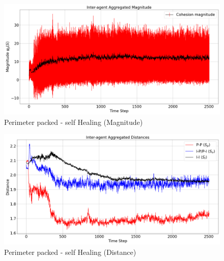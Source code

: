 \documentclass[12pt,a4paper]{IEEEtran}
\begin{document}
\begin{figure}[H]
	\begin{center}
		\includegraphics[width=1.0\linewidth]{figures/Future7}
	\end{center}
	\caption{Perimeter packed - self Healing (Magnitude)\label{fig:future7}}
\end{figure}

\begin{figure}[H]
	\begin{center}
		\includegraphics[width=1.0\linewidth]{figures/Future8}
	\end{center}
	\caption{Perimeter packed - self Healing (Distance)\label{fig:future8}}
\end{figure}



\end{document}
